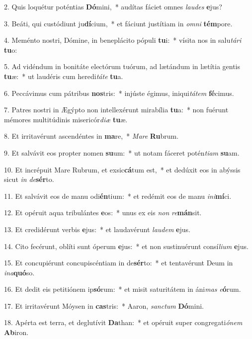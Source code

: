 2. Quis loquétur poténtias \textbf{Dó}mini,~*  audítas fáciet omnes \textit{lau}\textit{des} \textbf{e}jus?\

3. Beáti, qui custódiunt ju\textbf{dí}cium,~*  et fáciunt justítiam in \textit{om}\textit{ni} \textbf{tém}pore.\

4. Meménto nostri, Dómine, in beneplácito pópuli \textbf{tu}i:~*  vísita nos in salu\textit{tá}\textit{ri} \textbf{tu}o:\

5. Ad vidéndum in bonitáte electórum tuórum, ad lætándum in lætítia gentis \textbf{tu}æ:~*  ut laudéris cum heredi\textit{tá}\textit{te} \textbf{tu}a.\

6. Peccávimus cum pátribus \textbf{nos}tris:~*  injúste égimus, iniqui\textit{tá}\textit{tem} \textbf{fé}cimus.\

7. Patres nostri in Ægýpto non intellexérunt mirabília \textbf{tu}a:~*  non fuérunt mémores multitúdinis misericór\textit{di}\textit{æ} \textbf{tu}æ.\

8. Et irritavérunt ascendéntes in \textbf{ma}re,~*  \textit{Ma}\textit{re} \textbf{Ru}brum.\

9. Et salvávit eos propter nomen \textbf{su}um:~*  ut notam fáceret potén\textit{ti}\textit{am} \textbf{su}am.\

10. Et incrépuit Mare Rubrum, et exsic\textbf{cá}tum est,~*  et dedúxit eos in abýssis sicut \textit{in} \textit{de}\textbf{sér}to.\

11. Et salvávit eos de manu odi\textbf{én}tium:~*  et redémit eos de manu \textit{in}\textit{i}\textbf{mí}ci.\

12. Et opéruit aqua tribulántes \textbf{e}os:~*  unus ex eis \textit{non} \textit{re}\textbf{mán}sit.\

13. Et credidérunt verbis \textbf{e}jus:~*  et laudavérunt \textit{lau}\textit{dem} \textbf{e}jus.\

14. Cito fecérunt, oblíti sunt óperum \textbf{e}jus:~*  et non sustinuérunt consí\textit{li}\textit{um} \textbf{e}jus.\

15. Et concupiérunt concupiscéntiam in de\textbf{sér}to:~*  et tentavérunt Deum in \textit{in}\textit{a}\textbf{quó}so.\

16. Et dedit eis petitiónem ip\textbf{só}rum:~*  et misit saturitátem in áni\textit{mas} \textit{e}\textbf{ó}rum.\

17. Et irritavérunt Móysen in \textbf{cas}tris:~*  Aaron, \textit{sanc}\textit{tum} \textbf{Dó}mini.\

18. Apérta est terra, et deglutívit \textbf{Da}than:~*  et opéruit super congregati\textit{ó}\textit{nem} \textbf{Ab}iron.\

